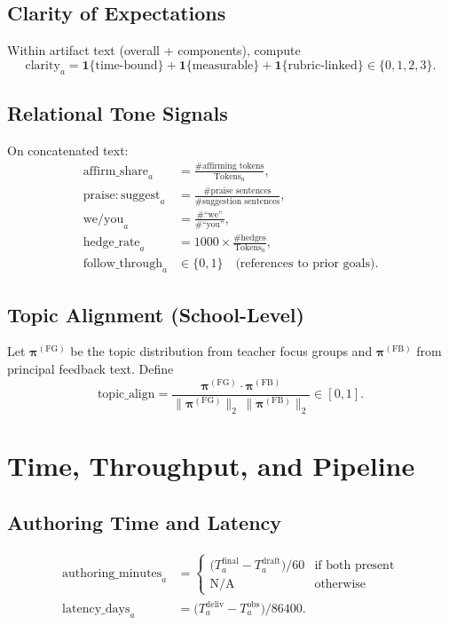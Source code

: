 \documentclass[11pt]{article}
\begin{document}
\subsection{Clarity of Expectations}
Within artifact text (overall + components), compute
\[
\mathrm{clarity}_a = \mathbf{1}\{\text{time-bound}\} + \mathbf{1}\{\text{measurable}\} + \mathbf{1}\{\text{rubric-linked}\} \in \{0,1,2,3\}.
\]

\subsection{Relational Tone Signals}
On concatenated text:
\begin{align}
\mathrm{affirm\_share}_a &= \frac{\#\text{affirming tokens}}{\text{Tokens}_a},\\
\mathrm{praise\!:\!suggest}_a &= \frac{\#\text{praise sentences}}{\#\text{suggestion sentences}},\\
\mathrm{we/you}_a &= \frac{\#\text{``we''}}{\#\text{``you''}},\\
\mathrm{hedge\_rate}_a &= 1000 \times \frac{\#\text{hedges}}{\text{Tokens}_a},\\
\mathrm{follow\_through}_a &\in \{0,1\}\quad \text{(references to prior goals)}.
\end{align}

\subsection{Topic Alignment (School-Level)}
Let $\bm{\pi}^{(\mathrm{FG})}$ be the topic distribution from teacher focus groups and $\bm{\pi}^{(\mathrm{FB})}$ from principal feedback text. Define
\begin{equation}
\mathrm{topic\_align} = \frac{\bm{\pi}^{(\mathrm{FG})} \cdot \bm{\pi}^{(\mathrm{FB})}}{\|\bm{\pi}^{(\mathrm{FG})}\|_2 \, \|\bm{\pi}^{(\mathrm{FB})}\|_2} \in [0,1].
\end{equation}

\section{Time, Throughput, and Pipeline}
\subsection{Authoring Time and Latency}
\begin{align}
\mathrm{authoring\_minutes}_a &=
\begin{cases}
\bigl(T^{\mathrm{final}}_a - T^{\mathrm{draft}}_a\bigr) / 60 & \text{if both present}\\
\text{N/A} & \text{otherwise}
\end{cases}\\[4pt]
\mathrm{latency\_days}_a &= \bigl(T^{\mathrm{deliv}}_a - T^{\mathrm{obs}}_a\bigr) / 86400.
\end{align}
\end{document}
